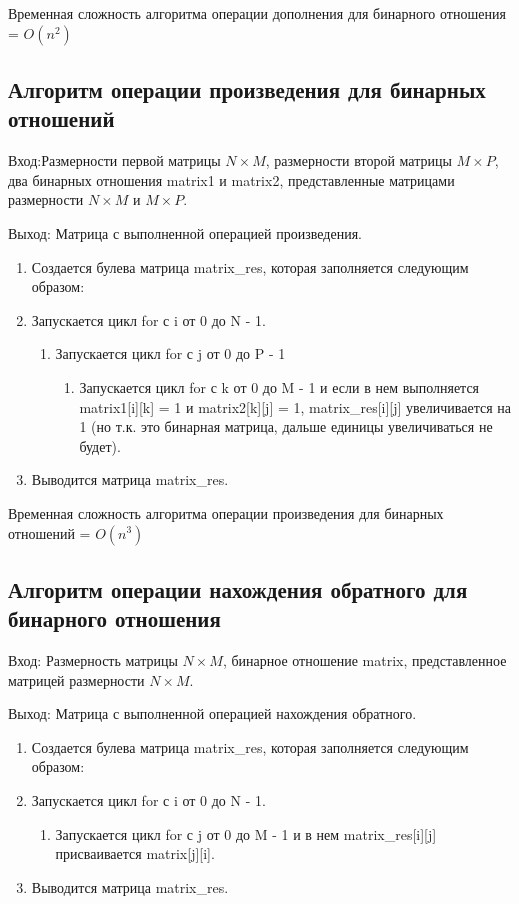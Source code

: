 \documentclass[bachelor, och, labwork]{shiza}
\begin{document}
	Временная сложность алгоритма операции дополнения для бинарного отношения = $O(n^2)$

	\subsection{Алгоритм операции произведения для бинарных отношений}
	
		$\textit{Вход:}$Размерности первой матрицы $N \times M$, размерности второй матрицы $M \times P$, два бинарных отношения matrix1 и matrix2, представленные матрицами размерности $N \times M$ и $M \times P$.
	
		$\textit{Выход:}$  Матрица с выполненной операцией произведения.	
			
	\begin{enumerate} 
		\item Создается булева матрица matrix\_res, которая заполняется следующим образом:
		\item Запускается цикл for с i от 0 до N - 1.
		\begin{enumerate} 
			\item Запускается цикл for с j от 0 до P - 1
			\begin{enumerate} 
			 \item Запускается цикл for с k от 0 до M - 1 и если в нем выполняется matrix1[i][k] = 1 и
			matrix2[k][j] = 1, matrix\_res[i][j] увеличивается на 1 (но т.к. это бинарная матрица, дальше единицы увеличиваться не будет).
			\end{enumerate}
		\end{enumerate}
		\item Выводится матрица matrix\_res.
	\end{enumerate} 
	
	Временная сложность алгоритма операции произведения для бинарных отношений = $O(n^3)$	
	
	\subsection{Алгоритм операции нахождения обратного для бинарного отношения}
	
			$\textit{Вход:}$ Размерность матрицы $N \times M$, бинарное отношение matrix, представленное матрицей размерности $N \times M$.

			$\textit{Выход:}$  Матрица с выполненной операцией нахождения обратного.	

	\begin{enumerate} 
		\item Создается булева матрица matrix\_res, которая заполняется следующим образом:
		\item Запускается цикл for с i от 0 до N - 1.
		\begin{enumerate} 
			\item Запускается цикл for с j от 0 до M - 1 и в нем   matrix\_res[i][j] присваивается matrix[j][i].
		\end{enumerate}
		\item Выводится матрица matrix\_res.
	\end{enumerate} 
	
\end{document}
